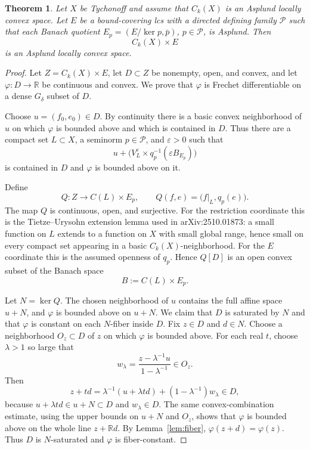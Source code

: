 \documentclass[11pt]{article}
\newtheorem{theorem}{Theorem}
\newcommand{\R}{\mathbb{R}}
\newcommand{\eps}{\varepsilon}
\begin{document}
\begin{theorem}\label{thm:main}
Let $X$ be Tychonoff and assume that $C_k(X)$ is an Asplund locally convex
space. Let $E$ be a bound-covering lcs with a directed defining family
$\mathcal P$ such that each Banach quotient $E_p=(E/\ker p,\bar p)$,
$p\in\mathcal P$, is Asplund. Then
\[
  C_k(X)\times E
\]
is an Asplund locally convex space.
\end{theorem}

\begin{proof}
Let $Z=C_k(X)\times E$, let $D\subset Z$ be nonempty, open, and convex, and let
$\varphi:D\to\R$ be continuous and convex. We prove that $\varphi$ is Frechet
differentiable on a dense $G_\delta$ subset of $D$.

Choose $u=(f_0,e_0)\in D$. By continuity there is a basic convex neighborhood
of $u$ on which $\varphi$ is bounded above and which is contained in $D$. Thus
there are a compact set $L\subset X$, a seminorm $p\in\mathcal P$, and
$\eps>0$ such that
\[
 u+\bigl(V_L^\eps\times q_p^{-1}(\eps B_{E_p})\bigr)
\]
is contained in $D$ and $\varphi$ is bounded above on it.

Define
\[
 Q:Z\longrightarrow C(L)\times E_p,\qquad
 Q(f,e)=\bigl(f|_L,q_p(e)\bigr).
\]
The map $Q$ is continuous, open, and surjective. For the restriction
coordinate this is the Tietze--Urysohn extension lemma used in
arXiv:2510.01873: a small function on $L$ extends to a function on $X$ with
small global range, hence small on every compact set appearing in a basic
$C_k(X)$-neighborhood. For the $E$ coordinate this is the assumed openness of
$q_p$. Hence $Q[D]$ is an open convex subset of the Banach space
\[
 B:=C(L)\times E_p.
\]

Let $N=\ker Q$. The chosen neighborhood of $u$ contains the full affine space
$u+N$, and $\varphi$ is bounded above on $u+N$. We claim that $D$ is saturated
by $N$ and that $\varphi$ is constant on each $N$-fiber inside $D$. Fix
$z\in D$ and $d\in N$. Choose a neighborhood $O_z\subset D$ of $z$ on which
$\varphi$ is bounded above. For each real $t$, choose $\lambda>1$ so large
that
\[
  w_\lambda=\frac{z-\lambda^{-1}u}{1-\lambda^{-1}}\in O_z .
\]
Then
\[
  z+td=\lambda^{-1}(u+\lambda t d)+(1-\lambda^{-1})w_\lambda\in D,
\]
because $u+\lambda t d\in u+N\subset D$ and $w_\lambda\in D$. The same
convex-combination estimate, using the upper bounds on $u+N$ and $O_z$, shows
that $\varphi$ is bounded above on the whole line $z+\R d$. By
Lemma~\ref{lem:fiber}, $\varphi(z+d)=\varphi(z)$. Thus $D$ is $N$-saturated
and $\varphi$ is fiber-constant.


\end{proof}
\end{document}
